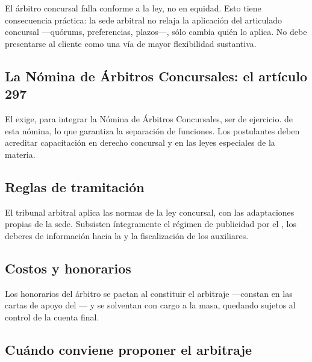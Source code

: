 \begin{alerta}
El árbitro concursal falla conforme a la ley, no en equidad. Esto tiene consecuencia práctica:
la sede arbitral no relaja la aplicación del articulado concursal ---quórums, preferencias,
plazos---, sólo cambia quién lo aplica. No debe presentarse al cliente como una vía de mayor
flexibilidad sustantiva.
\end{alerta}

\subsection{La Nómina de Árbitros Concursales: el artículo 297}

El  exige, para integrar la Nómina de Árbitros Concursales, ser  de ejercicio.  de esta nómina, lo que garantiza la separación de funciones. Los
postulantes deben acreditar capacitación en derecho concursal y en las leyes especiales de la
materia.

\subsection{Reglas de tramitación}

El tribunal arbitral aplica las normas de la ley concursal, con las adaptaciones propias de la
sede. Subsisten íntegramente el régimen de publicidad por el \boletin{}, los deberes de
información hacia la \superir{} y la fiscalización de los auxiliares.

\subsection{Costos y honorarios}

Los honorarios del árbitro se pactan al constituir el arbitraje ---constan en las cartas de
apoyo del --- y se solventan con cargo a la masa, quedando sujetos al control de la
cuenta final.

\bloquePractico

\subsection{Cuándo conviene proponer el arbitraje}

